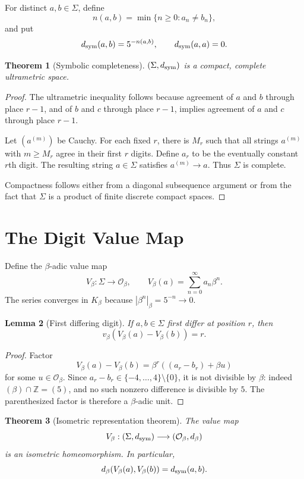\documentclass[11pt]{article}
\newtheorem{theorem}{Theorem}[section]
\newtheorem{lemma}[theorem]{Lemma}
\newcommand{\Z}{\mathbb Z}
\newcommand{\Ob}{\mathcal O_\beta}
\newcommand{\Kb}{K_\beta}
\begin{document}
For distinct $a,b\in\Sigma$, define
\[
n(a,b)=\min\{n\ge0:a_n\ne b_n\},
\]
and put
\[
d_{\rm sym}(a,b)=5^{-n(a,b)},\qquad d_{\rm sym}(a,a)=0.
\]

\begin{theorem}[Symbolic completeness]
$(\Sigma,d_{\rm sym})$ is a compact, complete ultrametric space.
\end{theorem}

\begin{proof}
The ultrametric inequality follows because agreement of $a$ and $b$ through place $r-1$, and of $b$ and $c$ through place $r-1$, implies agreement of $a$ and $c$ through place $r-1$.

Let $(a^{(m)})$ be Cauchy.  For each fixed $r$, there is $M_r$ such that all strings $a^{(m)}$ with $m\ge M_r$ agree in their first $r$ digits.  Define $a_r$ to be the eventually constant $r$th digit.  The resulting string $a\in\Sigma$ satisfies $a^{(m)}\to a$.  Thus $\Sigma$ is complete.

Compactness follows either from a diagonal subsequence argument or from the fact that $\Sigma$ is a product of finite discrete compact spaces.
\end{proof}

\section{The Digit Value Map}

Define the $\beta$-adic value map
\[
V_\beta:\Sigma\to\Ob,\qquad
V_\beta(a)=\sum_{n=0}^\infty a_n\beta^n.
\]
The series converges in $\Kb$ because $|\beta^n|_\beta=5^{-n}\to0$.

\begin{lemma}[First differing digit]
If $a,b\in\Sigma$ first differ at position $r$, then
\[
v_\beta\!\left(V_\beta(a)-V_\beta(b)\right)=r.
\]
\end{lemma}

\begin{proof}
Factor
\[
V_\beta(a)-V_\beta(b)
=\beta^r\left((a_r-b_r)+\beta u\right)
\]
for some $u\in\Ob$.  Since $a_r-b_r\in\{-4,\ldots,4\}\setminus\{0\}$, it is not divisible by $\beta$: indeed $(\beta)\cap\Z=(5)$, and no such nonzero difference is divisible by $5$.  The parenthesized factor is therefore a $\beta$-adic unit.
\end{proof}

\begin{theorem}[Isometric representation theorem]
The value map
\[
V_\beta:(\Sigma,d_{\rm sym})\longrightarrow(\Ob,d_\beta)
\]
is an isometric homeomorphism.  In particular,
\[
d_\beta(V_\beta(a),V_\beta(b))=d_{\rm sym}(a,b).
\]
\end{theorem}
\end{document}
